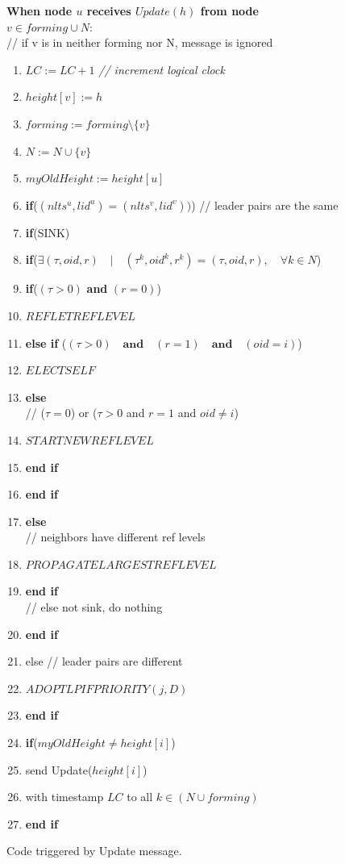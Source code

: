 \documentclass{article}
\begin{document}
\begin{figure}

\textbf{When node $u$ receives $Update(h)$ from node $v \in forming \cup N:$}
\\ \quad \quad // if v is in neither forming nor N, message is ignored
\begin{enumerate}
\item \quad $LC := LC + 1$   \textit{// increment logical clock}
\item \quad$height[v] := h$
\item \quad$forming := forming \setminus \lbrace v\rbrace$
\item \quad$N := N \cup \lbrace v\rbrace$
\item \quad$myOldHeight := height[u]$
\item \quad \textbf{if}($(nlts^u ,lid^u ) = (nlts^v ,lid^v ))$) // leader pairs are the same
\item \quad \quad \textbf{if}(SINK)
\item \quad \quad \quad \textbf{if}($\exists (\tau , oid, r)\quad | \quad (\tau ^k, oid^k, r^k) = (\tau , oid, r) ,\quad \forall k \in N $)
\item \quad \quad \quad \quad \textbf{if}($(\tau > 0)$ \textbf{and} $(r = 0)$)
\item \quad \quad \quad \quad \quad $REFLETREFLEVEL$
\item \quad \quad \quad \quad \textbf{else if} ($(\tau > 0)\quad \textbf{and} \quad (r = 1)\quad \textbf{and} \quad (oid = i)$)
\item \quad \quad \quad \quad \quad $ELECTSELF$
\item \quad \quad \quad \quad  \textbf{else}
\\ // ($\tau = 0$) or ($\tau >0$ and $r=1$ and $oid \neq i$)
\item \quad \quad \quad \quad \quad $STARTNEWREFLEVEL$
\item \quad \quad \quad \quad  \textbf{end if}
\item \quad \quad \quad \textbf{end if}
\item \quad \quad \textbf{else}
\\ // neighbors have different ref levels
\item \quad \quad \quad $PROPAGATELARGESTREFLEVEL$
\item \quad \quad \textbf{end if}
\\ \qquad // else not sink, do nothing
\item \quad \textbf{end if}
\item else // leader pairs are different
\item \quad $ADOPTLPIFPRIORITY(j,D)$
\item  \textbf{end if}
\item \textbf{if}($myOldHeight \neq height[i]$)
\item \quad send Update($height[i]$)
\item \quad with timestamp $LC$ to all $k \in (N \cup forming)$
\item \textbf{end if}
\end{enumerate}
\caption{Code triggered by Update message.}
\end{figure}
\end{document}
